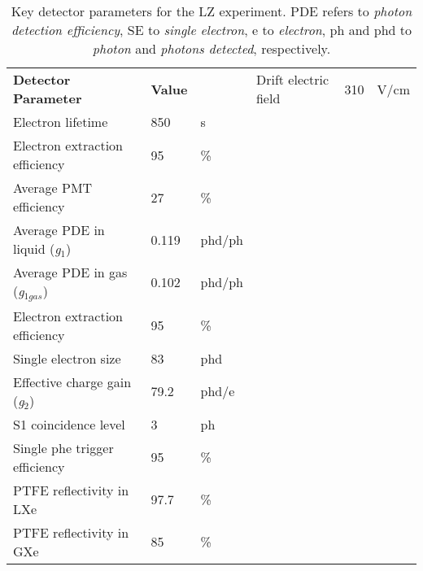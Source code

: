\begin{table}[b!]
\centering
\caption{Key detector parameters for the LZ experiment. PDE refers to \textit{photon detection efficiency}, SE to \textit{single electron}, e to \textit{electron}, ph and phd to \textit{photon} and \textit{photons detected}, respectively.}
\label{tab:lz_parameters}
\vspace{1mm}
\renewcommand{\arraystretch}{1.2}
    \begin{tabularx}{0.7\linewidth}{@{\extracolsep{\fill}}lll}
    \toprule
    \textbf{Detector Parameter} & %
    \textbf{Value} & %
    \textbf{} & %
    \hline
    \hline

    Drift electric field                        & 310 & V/cm \\
    Electron lifetime                           & 850 & \micro{}s \\
    Electron extraction efficiency              & 95 & \% \\
    Average PMT efficiency                      & 27 & \% \\
    Average PDE in liquid (\textit{g$_{1}$})    & 0.119 & phd/ph \\
    Average PDE in gas (\textit{g$_{1gas}$})    & 0.102 & phd/ph \\
    Electron extraction efficiency              & 95 & \% \\
    Single electron size                        & 83 & phd \\
    Effective charge gain (\textit{g$_{2}$})    & 79.2 & phd/e \\
    S1 coincidence level                        & 3 & ph \\
    Single phe trigger efficiency               & 95 & \% \\
    PTFE reflectivity in LXe                    & 97.7 & \% \\
    PTFE reflectivity in GXe                    & 85 & \% \\ 
    
    \bottomrule
    \end{tabularx}
\end{table}
